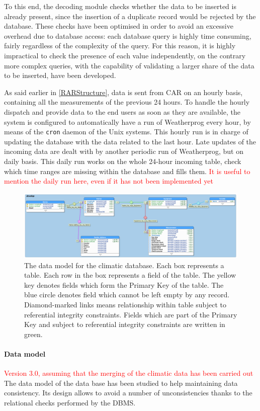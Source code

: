 \documentclass[authoryear,preprint,review,12pt]{elsarticle}
\begin{document}
 To this end, the decoding module checks whether the data to be inserted is already present, since the insertion of a duplicate record would be rejected by the database. These checks have been optimised in order to avoid an excessive overhead due to database access: each database query is highly time consuming, fairly regardless of the complexity of the query. For this reason, it is highly impractical to check the presence of each value independently, on the contrary more complex queries, with the capability of validating a larger share of the data to be inserted, have been developed.
 
As said earlier in \cref{RARStructure}, data is sent from CAR on an hourly basis,  containing all the measurements of the previous 24 hours. To handle the hourly dispatch and provide data to the end users as soon as they are available, the system is configured to automatically have a run of Weatherprog every hour, by means of the \texttt{cron} daemon of the Unix systems. This hourly run is in charge of updating the database with the data related to the last hour. Late updates of the incoming data are dealt with by another periodic run of Weatherprog, but on daily basis. This daily run works on the whole 24-hour incoming table, check which time ranges are missing within the database and fills them. \textcolor{Red}{It is useful to mention the daily run here, even if it has not been implemented yet}

\begin{figure}
	\includegraphics[scale=.26]{ERD}
	\caption{The data model for the climatic database. Each box represents a table. Each row in the box represents a field of the table. The yellow key denotes fields which form the Primary Key of the table. The blue circle denotes field which cannot be left empty by any record. Diamond-marked links means relationship within table subject to referential integrity constraints. Fields which are part of the Primary Key and subject to referential integrity constraints are written in green.}
	\label{ERD}
\end{figure}


\paragraph{Data model}\textcolor{Red}{Version 3.0, assuming that the merging of the climatic data has been carried out} The data model of the data base has been studied to help maintaining data consistency. Its design allows to avoid a number of unconsistencies thanks to the relational checks performed by the DBMS. 
\end{document}
